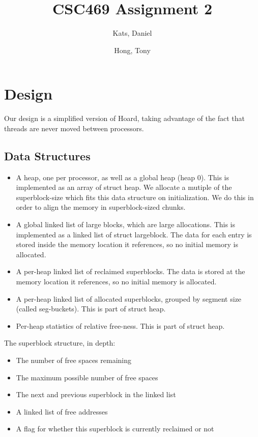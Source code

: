 \documentclass[a4paper, 12pt]{article}
\begin{document}
\begin{titlepage}
	\title{CSC469 Assignment 2}
	\author{Kats, Daniel \and Hong, Tony}
	\clearpage
	\maketitle
	\thispagestyle{empty}
\end{titlepage}

\section{Design}

Our design is a simplified version of Hoard, taking advantage of the fact that threads are never moved between processors.

\subsection{Data Structures}

\begin{itemize}
	\item A heap, one per processor, as well as a global heap (heap 0). This is implemented as an array of struct heap. We allocate a mutiple of the superblock-size which fits this data structure on initialization. We do this in order to align the memory in superblock-sized chunks.
	\item A global linked list of large blocks, which are large allocations. This is implemented as a linked list of struct largeblock. The  data for each entry is stored inside the memory location it references, so no initial memory is allocated.
	\item A per-heap linked list of reclaimed superblocks. The data is stored at the memory location it references, so no initial memory is allocated.
	\item A per-heap linked list of allocated superblocks, grouped by segment size (called seg-buckets). This is part of struct heap.
	\item Per-heap statistics of relative free-ness. This is part of struct heap.
\end{itemize}

The superblock structure, in depth:

\begin{itemize}
	\item The number of free spaces remaining
	\item The maximum possible number of free spaces
	\item The next and previous superblock in the linked list
	\item A linked list of free addresses
	\item A flag for whether this superblock is currently reclaimed or not
\end{itemize}
\end{document}
